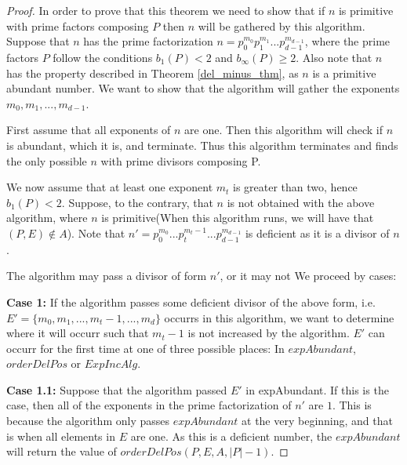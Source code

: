 \documentclass[../paper.tex]{subfiles}
\begin{document}
\begin{proof}
  In order to prove that this theorem we need to show that if $n$
is primitive with prime factors composing $P$ then $n$ 
will be gathered by this algorithm. Suppose that $n$ has the
prime factorization $n = p_0^{m_0} p_1^{m_1} ...
p_{d-1}^{m_{d-1}}$, where the prime factors $P$ follow the
conditions $b_1(P) < 2$ and $b_{\infty}(P) \geq 2$. Also note 
that $n$ has the property described in Theorem
{\ref{del_minus_thm}}, as $n$ is a primitive abundant number. 
We want to show that the algorithm will gather the exponents 
$m_0, m_1, ..., m_{d-1}$. 

  First assume that all exponents of $n$ are one. Then this
algorithm will check if $n$ is abundant, which it is, and
terminate. Thus this algorithm terminates and finds the only
possible $n$ with prime divisors composing P. 


  We now assume that at least one exponent $m_t$ is greater than
two, hence $b_1(P) < 2$. Suppose, to the contrary, that $n$ is not
obtained with the above algorithm, where $n$ is primitive(When
this algorithm runs, we will have that $(P,E) \notin A$). Note that 
$n' = p_0^{m_0}...p_t^{m_t - 1}...p_{d-1}^{m_{d-1}}$ is deficient 
as it is a divisor of $n$. 

  The algorithm may pass a divisor of form $n'$, or it may not
We proceed by cases:

\textbf{Case 1:}
  If the algorithm passes some deficient divisor of the above form, 
i.e. $E' = \{m_0, m_1, ..., m_t - 1, ..., m_d \}$ occurrs in this 
algorithm, we want to determine where it will occurr such that 
$m_t - 1$ is not increased by the algorithm. $E'$ can occurr for
the first time at one of three possible places: In $expAbundant$, 
$orderDelPos$ or $ExpIncAlg$.

\textbf{Case 1.1:}  
  Suppose that the algorithm passed $E'$ in expAbundant. If this
is the case, then all of the exponents in the prime factorization
of $n'$ are $1$. This is because the algorithm only passes
$expAbundant$ at the very beginning, and that is when all elements
in $E$ are one. As this is a deficient number, the $expAbundant$
will return the value of $orderDelPos(P,E,A,|P| - 1)$.



\end{proof}
\end{document}

